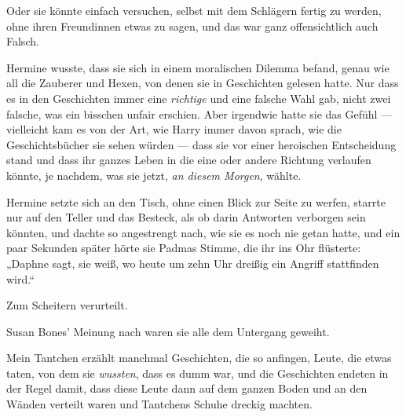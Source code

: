 Oder sie könnte einfach versuchen, selbst mit dem Schlägern fertig zu werden, ohne ihren Freundinnen etwas zu sagen, und das war ganz offensichtlich auch Falsch.

Hermine wusste, dass sie sich in einem moralischen Dilemma befand, genau wie all die Zauberer und Hexen, von denen sie in Geschichten gelesen hatte. Nur dass es in den Geschichten immer eine \emph{richtige} und eine falsche Wahl gab, nicht zwei falsche, was ein bisschen unfair erschien. Aber irgendwie hatte sie das Gefühl — vielleicht kam es von der Art, wie Harry immer davon sprach, wie die Geschichtsbücher sie sehen würden — dass sie vor einer heroischen Entscheidung stand und dass ihr ganzes Leben in die eine oder andere Richtung verlaufen könnte, je nachdem, was sie jetzt, \emph{an diesem Morgen}, wählte.

Hermine setzte sich an den Tisch, ohne einen Blick zur Seite zu werfen, starrte nur auf den Teller und das Besteck, als ob darin Antworten verborgen sein könnten, und dachte so angestrengt nach, wie sie es noch nie getan hatte, und ein paar Sekunden später hörte sie Padmas Stimme, die ihr ins Ohr flüsterte:
„Daphne sagt, sie weiß, wo heute um zehn Uhr dreißig ein Angriff stattfinden wird.“

\later

Zum Scheitern verurteilt.

Susan Bones’ Meinung nach waren sie alle dem Untergang geweiht.

Mein Tantchen erzählt manchmal Geschichten, die so anfingen, Leute, die etwas taten, von dem sie \emph{wussten}, dass es dumm war, und die Geschichten endeten in der Regel damit, dass diese Leute dann auf dem ganzen Boden und an den Wänden verteilt waren und Tantchens Schuhe dreckig machten.

